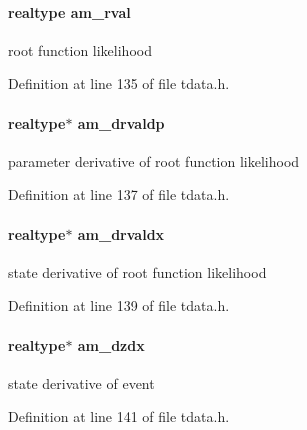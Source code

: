 \hypertarget{struct_temp_data_abf2c3d254f311ab4385f18cff8acb89a}{}
\paragraph[{am\+\_\+rval}]{\setlength{\rightskip}{0pt plus 5cm}realtype am\+\_\+rval}\label{struct_temp_data_abf2c3d254f311ab4385f18cff8acb89a}
root function likelihood 

Definition at line 135 of file tdata.\+h.

\hypertarget{struct_temp_data_af51ded83b415e8a9d8e4f67736d11d34}{}
\paragraph[{am\+\_\+drvaldp}]{\setlength{\rightskip}{0pt plus 5cm}realtype$\ast$ am\+\_\+drvaldp}\label{struct_temp_data_af51ded83b415e8a9d8e4f67736d11d34}
parameter derivative of root function likelihood 

Definition at line 137 of file tdata.\+h.

\hypertarget{struct_temp_data_ae474fa93074514dd5b9d6ef00aa7345d}{}
\paragraph[{am\+\_\+drvaldx}]{\setlength{\rightskip}{0pt plus 5cm}realtype$\ast$ am\+\_\+drvaldx}\label{struct_temp_data_ae474fa93074514dd5b9d6ef00aa7345d}
state derivative of root function likelihood 

Definition at line 139 of file tdata.\+h.

\hypertarget{struct_temp_data_a9309d8a421155cac9ad1c3fd1b5b0f56}{}
\paragraph[{am\+\_\+dzdx}]{\setlength{\rightskip}{0pt plus 5cm}realtype$\ast$ am\+\_\+dzdx}\label{struct_temp_data_a9309d8a421155cac9ad1c3fd1b5b0f56}
state derivative of event 

Definition at line 141 of file tdata.\+h.

